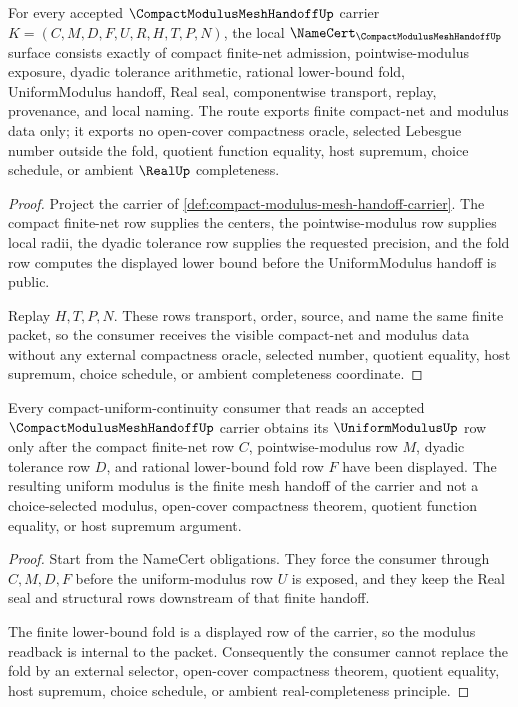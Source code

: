 \begin{theorem}
\label{thm:compact-modulus-mesh-handoff-namecert-obligations}
For every accepted $\CompactModulusMeshHandoffUp$ carrier $K=(C,M,D,F,U,R,H,T,P,N)$, the local $\NameCert_{\CompactModulusMeshHandoffUp}$ surface consists exactly of compact finite-net admission, pointwise-modulus exposure, dyadic tolerance arithmetic, rational lower-bound fold, UniformModulus handoff, Real seal, componentwise transport, replay, provenance, and local naming. The route exports finite compact-net and modulus data only; it exports no open-cover compactness oracle, selected Lebesgue number outside the fold, quotient function equality, host supremum, choice schedule, or ambient $\RealUp$ completeness.
\end{theorem}
\begin{proof}
Project the carrier of \autoref{def:compact-modulus-mesh-handoff-carrier}. The compact finite-net row supplies the centers, the pointwise-modulus row supplies local radii, the dyadic tolerance row supplies the requested precision, and the fold row computes the displayed lower bound before the UniformModulus handoff is public.

Replay $H,T,P,N$. These rows transport, order, source, and name the same finite packet, so the consumer receives the visible compact-net and modulus data without any external compactness oracle, selected number, quotient equality, host supremum, choice schedule, or ambient completeness coordinate.
\end{proof}

\begin{theorem}
\label{thm:compact-modulus-mesh-handoff-uniform-modulus}
Every compact-uniform-continuity consumer that reads an accepted $\CompactModulusMeshHandoffUp$ carrier obtains its $\UniformModulusUp$ row only after the compact finite-net row $C$, pointwise-modulus row $M$, dyadic tolerance row $D$, and rational lower-bound fold row $F$ have been displayed. The resulting uniform modulus is the finite mesh handoff of the carrier and not a choice-selected modulus, open-cover compactness theorem, quotient function equality, or host supremum argument.
\end{theorem}
\begin{proof}
Start from the NameCert obligations. They force the consumer through $C,M,D,F$ before the uniform-modulus row $U$ is exposed, and they keep the Real seal and structural rows downstream of that finite handoff.

The finite lower-bound fold is a displayed row of the carrier, so the modulus readback is internal to the packet. Consequently the consumer cannot replace the fold by an external selector, open-cover compactness theorem, quotient equality, host supremum, choice schedule, or ambient real-completeness principle.
\end{proof}

